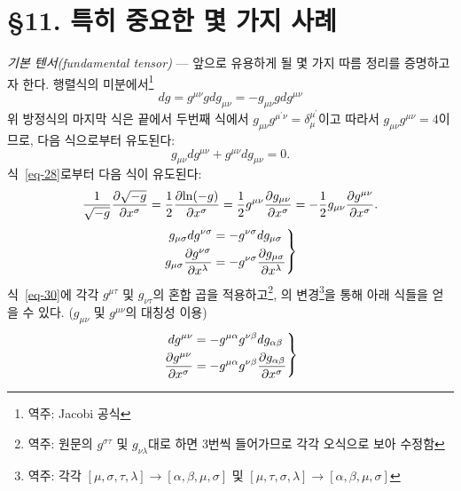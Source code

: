\documentclass[b5paper]{article}
\begin{document}
\section*{\S 11. 특히 중요한 몇 가지 사례}
\emph{기본 텐서(fundamental tensor)} --- 앞으로 유용하게 될 몇 가지 따름 정리를 증명하고자 한다. 행렬식의 미분에서\footnote{역주: Jacobi 공식}
\begin{equation} \label{eq-28}
	dg = g^{\mu\nu} g dg_{\mu\nu} = -g_{\mu\nu} g dg^{\mu\nu}
\end{equation}
위 방정식의 마지막 식은 끝에서 두번째 식에서 $g_{\mu\nu} g^{\mu^\prime \nu} = \delta_\mu^{\mu^\prime}$이고 따라서 $g_{\mu\nu} g^{\mu\nu} = 4$이므로, 다음 식으로부터 유도된다:
\begin{equation*}
	g_{\mu\nu} dg^{\mu\nu} + g^{\mu\nu} dg_{\mu\nu} = 0.
\end{equation*}
식~\eqref{eq-28}로부터 다음 식이 유도된다:
\begin{equation} \label{eq-29}
	\dfrac{1}{\sqrt{-g}}{\frac{{\partial}{\sqrt{-g}}}{{\partial}{x^\sigma}}}
	= \dfrac{1}{2} {\frac{{\partial}{\ln(-g)}}{{\partial}{x^\sigma}}}
	= \dfrac{1}{2} g^{\mu\nu} {\frac{{\partial}{g_{\mu\nu}}}{{\partial}{x^\sigma}}}
	= -\dfrac{1}{2} g_{\mu\nu} {\frac{{\partial}{g^{\mu\nu}}}{{\partial}{x^\sigma}}}.
\end{equation}
\begin{equation} \label{eq-30}
	\left.
	\begin{aligned}
	   g_{\mu\sigma} dg^{\nu\sigma}&=-g^{\nu\sigma} dg_{\mu\sigma} \\
	   g_{\mu\sigma} {\frac{{\partial}{g^{\nu\sigma}}}{{\partial}{x^\lambda}}}
	   &= -g^{\nu\sigma} {\frac{{\partial}{g_{\mu\sigma}}}{{\partial}{x^\lambda}}}
	\end{aligned}
	\right\}
\end{equation}
식~\eqref{eq-30}에 각각 $g^{\mu\tau}$ 및 $g_{\nu\tau}$의 혼합 곱을 적용하고\footnote{역주: 원문의 $g^{\sigma\tau}$ 및 $g_{\nu\lambda}$대로 하면 \ind{}\가 3번씩 들어가므로 각각 오식으로 보아 수정함}, \ind{}의 변경\footnote{역주: 각각 $ \left[\mu, \sigma, \tau, \lambda\right]\rightarrow \left[\alpha, \beta, \mu, \sigma\right] $ 및 $ \left[\mu, \tau, \sigma, \lambda\right]\rightarrow \left[\alpha, \beta, \mu, \sigma\right] $}을 통해 아래 식들을 얻을 수 있다. ($g_{\mu\nu}$ 및 $g^{\mu\nu}$의 대칭성 이용)
\begin{equation} \label{eq-31}
\left.
\begin{aligned}
dg^{\mu\nu}&=- g^{\mu\alpha} g^{\nu\beta}dg_{\alpha\beta} \\
{\frac{{\partial}{g^{\mu\nu}}}{{\partial}{x^\sigma}}}
&= - g^{\mu\alpha} g^{\nu\beta} {\frac{{\partial}{g_{\alpha\beta}}}{{\partial}{x^\sigma}}} 
\end{aligned}
\right\}
\end{equation}
\end{document}
